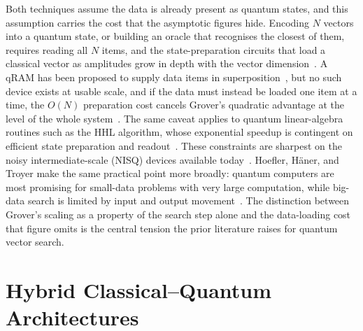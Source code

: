 Both techniques assume the data is already present as quantum states, and this
assumption carries the cost that the asymptotic figures hide. Encoding $N$
vectors into a quantum state, or building an oracle that recognises the closest
of them, requires reading all $N$ items, and the state-preparation circuits that
load a classical vector as amplitudes grow in depth with the vector
dimension~\cite{mottonen2005statprep,plesch2011statprep}. A qRAM has been
proposed to supply data items in superposition~\cite{giovannetti2008qram}, but no
such device exists at usable scale, and if the data must instead be loaded one
item at a time, the $O(N)$ preparation cost cancels Grover's quadratic advantage
at the level of the whole system~\cite{aaronson2015readfine}. The same caveat
applies to quantum linear-algebra routines such as the HHL algorithm, whose
exponential speedup is contingent on efficient state preparation and
readout~\cite{harrow2009hhl}. These constraints are sharpest on the noisy
intermediate-scale (NISQ) devices available today~\cite{preskill2018nisq}.
Hoefler, H\"{a}ner, and Troyer make the same practical point more broadly:
quantum computers are most promising for small-data problems with very large
computation, while big-data search is limited by input and output
movement~\cite{hoefler2023practicality}.
The distinction between Grover's scaling as a property of the search step alone
and the data-loading cost that figure omits is the central tension the prior
literature raises for quantum vector search.

\section{Hybrid Classical--Quantum Architectures}
\label{sec:lit:hybrid}


